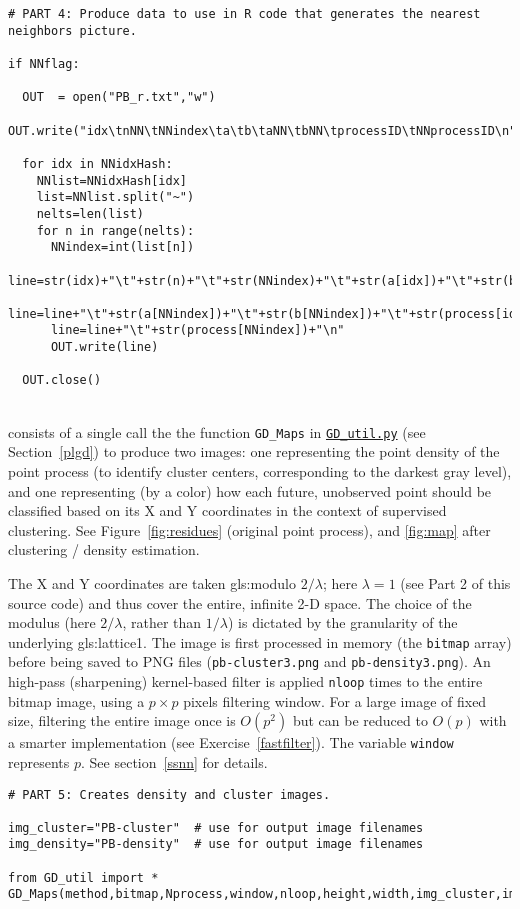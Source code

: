 \documentclass[10pt]{article}
\begin{document}
\begin{lstlisting}
# PART 4: Produce data to use in R code that generates the nearest neighbors picture.

if NNflag:

  OUT  = open("PB_r.txt","w")     
  OUT.write("idx\tnNN\tNNindex\ta\tb\taNN\tbNN\tprocessID\tNNprocessID\n")

  for idx in NNidxHash:
    NNlist=NNidxHash[idx]
    list=NNlist.split("~")
    nelts=len(list)
    for n in range(nelts): 
      NNindex=int(list[n])
      line=str(idx)+"\t"+str(n)+"\t"+str(NNindex)+"\t"+str(a[idx])+"\t"+str(b[idx])
      line=line+"\t"+str(a[NNindex])+"\t"+str(b[NNindex])+"\t"+str(process[idx])
      line=line+"\t"+str(process[NNindex])+"\n"
      OUT.write(line)  
                
  OUT.close()
\end{lstlisting}
\quad \\
 consists of a single call the the function \texttt{GD\_Maps} in 
\href{https://bit.ly/3vmEGek}{\texttt{GD\_util.py}} (see Section~\ref{plgd}) to produce two images:
one representing the point density of the point process (to identify cluster centers, corresponding to the darkest gray level), and one representing (by a color) how each future, unobserved point should
be classified based on its X and Y coordinates in the context of supervised clustering. See Figure~\ref{fig:residues} (original point process), and 
\ref{fig:map} after clustering / density estimation.

The X and Y coordinates are taken 
 \gls{gls:modulo} $2/\lambda$; here $\lambda=1$ (see Part 2 of this source code)
and thus cover the entire, infinite 2-D space. The choice of the modulus (here $2/\lambda$, rather than $1/\lambda$) is dictated by the granularity of the underlying
\gls{gls:lattice1}. The image is first processed
in memory (the \texttt{bitmap} array) before being saved to PNG files (\texttt{pb-cluster3.png} and \texttt{pb-density3.png}). An
high-pass (sharpening) kernel-based filter is applied 
\texttt{nloop} times to the entire bitmap image, using a $p\times p$ pixels filtering window. For a large image of fixed size, filtering the entire image once is $O(p^2)$
 but can be reduced to $O(p)$ with a smarter implementation (see Exercise~\ref{fastfilter}). The variable \texttt{window} represents $p$.
See section~\ref{ssnn} for details. 

\begin{lstlisting}
# PART 5: Creates density and cluster images.

img_cluster="PB-cluster"  # use for output image filenames
img_density="PB-density"  # use for output image filenames

from GD_util import *
GD_Maps(method,bitmap,Nprocess,window,nloop,height,width,img_cluster,img_density)
\end{lstlisting}
\end{document}
